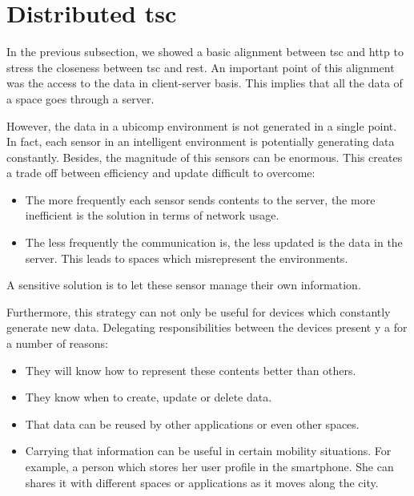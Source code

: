 \section{Distributed \ac{tsc}}

In the previous subsection, we showed a basic alignment between \ac{tsc} and \ac{http} to stress the closeness between \ac{tsc} and \ac{rest}.
An important point of this alignment was the access to the data in client-server basis.
This implies that all the data of a space goes through a server. %

However, the data in a \ac{ubicomp} environment is not generated in a single point.
In fact, each sensor in an intelligent environment is potentially generating data constantly.
Besides, the magnitude of this sensors can be enormous.
This creates a trade off between efficiency and update difficult to overcome:
\begin{itemize}
  \item The more frequently each sensor sends contents to the server, the more inefficient is the solution in terms of network usage.
  \item The less frequently the communication is, the less updated is the data in the server.
        This leads to spaces which misrepresent the environments.
\end{itemize}
A sensitive solution is to let these sensor manage their own information.

Furthermore, this strategy can not only be useful for devices which constantly generate new data.
Delegating responsibilities between the devices present y a for a number of reasons:
\begin{itemize}
  \item They will know how to represent these contents better than others.
  \item They know when to create, update or delete data.
  \item That data can be reused by other applications or even other spaces.
  \item Carrying that information can be useful in certain mobility situations.
        For example, a person which stores her user profile in the smartphone.
        She can shares it with different spaces or applications as it moves along the city.
\end{itemize}


